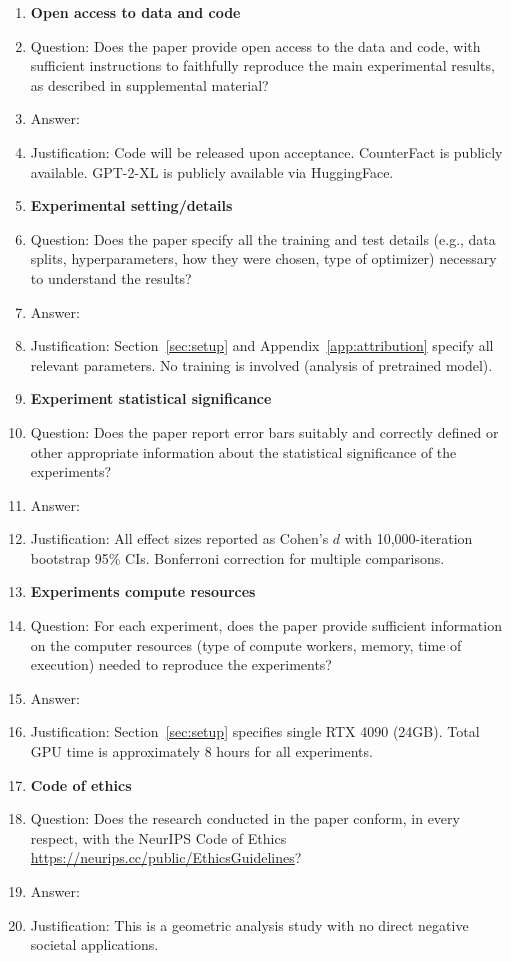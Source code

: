 \begin{enumerate}
\item {\bf Open access to data and code}
    \item[] Question: Does the paper provide open access to the data and code, with sufficient instructions to faithfully reproduce the main experimental results, as described in supplemental material?
    \item[] Answer: \answerNo{}
    \item[] Justification: Code will be released upon acceptance. CounterFact is publicly available. GPT-2-XL is publicly available via HuggingFace.

\item {\bf Experimental setting/details}
    \item[] Question: Does the paper specify all the training and test details (e.g., data splits, hyperparameters, how they were chosen, type of optimizer) necessary to understand the results?
    \item[] Answer: \answerYes{}
    \item[] Justification: Section~\ref{sec:setup} and Appendix~\ref{app:attribution} specify all relevant parameters. No training is involved (analysis of pretrained model).

\item {\bf Experiment statistical significance}
    \item[] Question: Does the paper report error bars suitably and correctly defined or other appropriate information about the statistical significance of the experiments?
    \item[] Answer: \answerYes{}
    \item[] Justification: All effect sizes reported as Cohen's $d$ with 10,000-iteration bootstrap 95\% CIs. Bonferroni correction for multiple comparisons.

\item {\bf Experiments compute resources}
    \item[] Question: For each experiment, does the paper provide sufficient information on the computer resources (type of compute workers, memory, time of execution) needed to reproduce the experiments?
    \item[] Answer: \answerYes{}
    \item[] Justification: Section~\ref{sec:setup} specifies single RTX 4090 (24GB). Total GPU time is approximately 8 hours for all experiments.

\item {\bf Code of ethics}
    \item[] Question: Does the research conducted in the paper conform, in every respect, with the NeurIPS Code of Ethics \url{https://neurips.cc/public/EthicsGuidelines}?
    \item[] Answer: \answerYes{}
    \item[] Justification: This is a geometric analysis study with no direct negative societal applications.


\end{enumerate}
